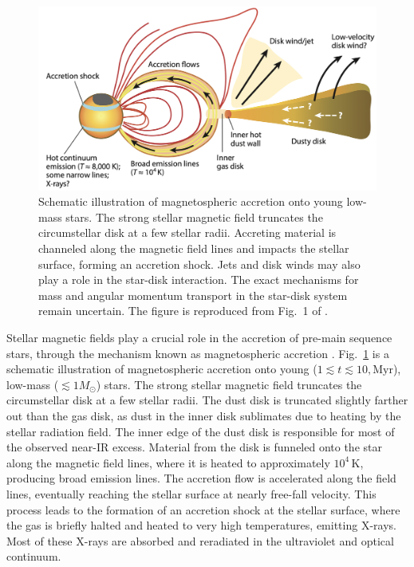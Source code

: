 \documentclass[12pt,a4paper]{article}
\newcommand{\mr}{\mathrm}
\begin{document}
\begin{figure}
  \centering
  \includegraphics[width=.8\textwidth]{HartmannEtAl2016_magnetospheric_accretion.png}
  \caption{Schematic illustration of magnetospheric accretion onto young low-mass stars. The strong stellar magnetic field truncates the circumstellar disk at a few stellar radii. Accreting material is channeled along the magnetic field lines and impacts the stellar surface, forming an accretion shock. Jets and disk winds may also play a role in the star-disk interaction. The exact mechanisms for mass and angular momentum transport in the star-disk system remain uncertain. The figure is reproduced from Fig.~1 of \textcite{HartmannEtAl2016}.}
  \label{fig:magnetospheric_accretion}
\end{figure}

Stellar magnetic fields play a crucial role in the accretion of pre-main sequence stars, through the mechanism known as magnetospheric accretion \parencite[See, for example,][for a review]{HartmannEtAl2016}. Fig.~\ref{fig:magnetospheric_accretion} is a schematic illustration of magnetospheric accretion onto young ($1 \lesssim t \lesssim 10,\mr{Myr}$), low-mass ($\lesssim 1 M_\odot$) stars. The strong stellar magnetic field truncates the circumstellar disk at a few stellar radii. The dust disk is truncated slightly farther out than the gas disk, as dust in the inner disk sublimates due to heating by the stellar radiation field. The inner edge of the dust disk is responsible for most of the observed near-IR excess. Material from the disk is funneled onto the star along the magnetic field lines, where it is heated to approximately $10^4\,\mr{K}$, producing broad emission lines. The accretion flow is accelerated along the field lines, eventually reaching the stellar surface at nearly free-fall velocity. This process leads to the formation of an accretion shock at the stellar surface, where the gas is briefly halted and heated to very high temperatures, emitting X-rays. Most of these X-rays are absorbed and reradiated in the ultraviolet and optical continuum.
\end{document}
